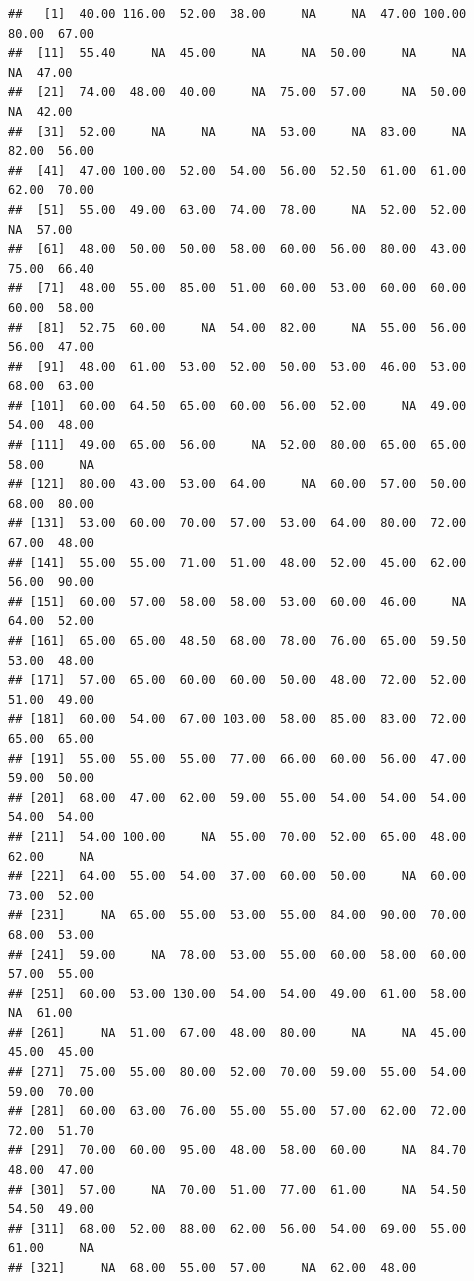 \documentclass[
]{article}
\begin{document}
\begin{verbatim}
##   [1]  40.00 116.00  52.00  38.00     NA     NA  47.00 100.00  80.00  67.00
##  [11]  55.40     NA  45.00     NA     NA  50.00     NA     NA     NA  47.00
##  [21]  74.00  48.00  40.00     NA  75.00  57.00     NA  50.00     NA  42.00
##  [31]  52.00     NA     NA     NA  53.00     NA  83.00     NA  82.00  56.00
##  [41]  47.00 100.00  52.00  54.00  56.00  52.50  61.00  61.00  62.00  70.00
##  [51]  55.00  49.00  63.00  74.00  78.00     NA  52.00  52.00     NA  57.00
##  [61]  48.00  50.00  50.00  58.00  60.00  56.00  80.00  43.00  75.00  66.40
##  [71]  48.00  55.00  85.00  51.00  60.00  53.00  60.00  60.00  60.00  58.00
##  [81]  52.75  60.00     NA  54.00  82.00     NA  55.00  56.00  56.00  47.00
##  [91]  48.00  61.00  53.00  52.00  50.00  53.00  46.00  53.00  68.00  63.00
## [101]  60.00  64.50  65.00  60.00  56.00  52.00     NA  49.00  54.00  48.00
## [111]  49.00  65.00  56.00     NA  52.00  80.00  65.00  65.00  58.00     NA
## [121]  80.00  43.00  53.00  64.00     NA  60.00  57.00  50.00  68.00  80.00
## [131]  53.00  60.00  70.00  57.00  53.00  64.00  80.00  72.00  67.00  48.00
## [141]  55.00  55.00  71.00  51.00  48.00  52.00  45.00  62.00  56.00  90.00
## [151]  60.00  57.00  58.00  58.00  53.00  60.00  46.00     NA  64.00  52.00
## [161]  65.00  65.00  48.50  68.00  78.00  76.00  65.00  59.50  53.00  48.00
## [171]  57.00  65.00  60.00  60.00  50.00  48.00  72.00  52.00  51.00  49.00
## [181]  60.00  54.00  67.00 103.00  58.00  85.00  83.00  72.00  65.00  65.00
## [191]  55.00  55.00  55.00  77.00  66.00  60.00  56.00  47.00  59.00  50.00
## [201]  68.00  47.00  62.00  59.00  55.00  54.00  54.00  54.00  54.00  54.00
## [211]  54.00 100.00     NA  55.00  70.00  52.00  65.00  48.00  62.00     NA
## [221]  64.00  55.00  54.00  37.00  60.00  50.00     NA  60.00  73.00  52.00
## [231]     NA  65.00  55.00  53.00  55.00  84.00  90.00  70.00  68.00  53.00
## [241]  59.00     NA  78.00  53.00  55.00  60.00  58.00  60.00  57.00  55.00
## [251]  60.00  53.00 130.00  54.00  54.00  49.00  61.00  58.00     NA  61.00
## [261]     NA  51.00  67.00  48.00  80.00     NA     NA  45.00  45.00  45.00
## [271]  75.00  55.00  80.00  52.00  70.00  59.00  55.00  54.00  59.00  70.00
## [281]  60.00  63.00  76.00  55.00  55.00  57.00  62.00  72.00  72.00  51.70
## [291]  70.00  60.00  95.00  48.00  58.00  60.00     NA  84.70  48.00  47.00
## [301]  57.00     NA  70.00  51.00  77.00  61.00     NA  54.50  54.50  49.00
## [311]  68.00  52.00  88.00  62.00  56.00  54.00  69.00  55.00  61.00     NA
## [321]     NA  68.00  55.00  57.00     NA  62.00  48.00
\end{verbatim}
\end{document}
